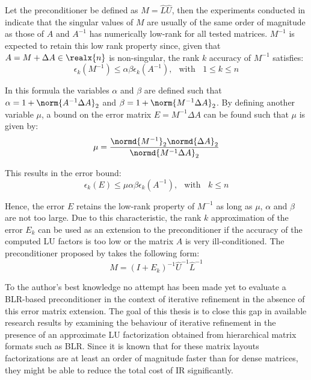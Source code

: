 \noindent Let the preconditioner be defined as $M=\hat{L}\hat{U}$, then the experiments conducted in \cite{higham_new_2019} indicate that the singular values of $M$ are usually of the same order of magnitude as those of $A$ and $A^{-1}$ has numerically low-rank for all tested matrices. $M^{-1}$ is expected to retain this low rank property since, given that $A=M+\Delta A \in \realx{n}$ is non-singular, the rank $k$ accuracy of $M^{-1}$ satisfies:
\begin{equation}
    \epsilon_k(M^{-1}) \leq \alpha\beta\epsilon_k(A^{-1})\text{,} \;\; \text{ with } \;\; 1\leq k \leq n
\end{equation}

\noindent In this formula the variables $\alpha$ and $\beta$ are defined such that $\alpha=1+\norm{A^{-1}\Delta A}_2$ and $\beta=1+\norm{M^{-1}\Delta A}_2$. By defining another variable $\mu$, a bound on the error matrix $E=M^{-1}\Delta A$ can be found such that $\mu$ is given by:
\begin{equation}
    \mu=\frac{\normd{M^{-1}}_2\normd{\Delta A}_2}{\normd{M^{-1}\Delta A}_2}
\end{equation}

\noindent This results in the error bound:
\begin{equation}
    \epsilon_k(E) \leq \mu\alpha\beta\epsilon_k(A^{-1})\text{,} \;\; \text{ with } \;\; k \leq n
\end{equation}

\noindent Hence, the error $E$ retains the low-rank property of $M^{-1}$ as long as $\mu$, $\alpha$ and $\beta$ are not too large. Due to this characteristic, the rank $k$ approximation of the error $E_k$ can be used as an extension to the preconditioner if the accuracy of the computed LU factors is too low or the matrix $A$ is very ill-conditioned. The preconditioner proposed by \cite{higham_new_2019} takes the following form:
\begin{equation}
    M = (I + E_k)^{-1}\hat{U}^{-1}\hat{L}^{-1}
\end{equation}

\noindent To the author's best knowledge no attempt has been made yet to evaluate a BLR-based preconditioner in the context of iterative refinement in the absence of this error matrix extension. The goal of this thesis is to close this gap in available research results by examining the behaviour of iterative refinement in the presence of an approximate LU factorization obtained from hierarchical matrix formats such as BLR. Since it is known that for these matrix layouts factorizations are at least an order of magnitude faster than for dense matrices, they might be able to reduce the total cost of IR significantly.